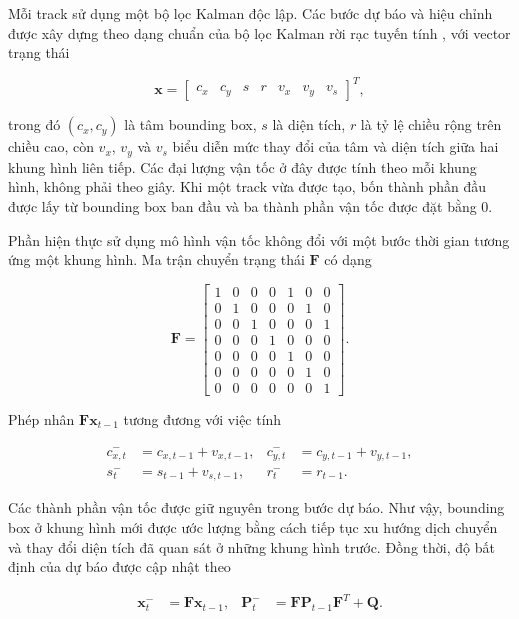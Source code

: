 Mỗi track sử dụng một bộ lọc Kalman độc lập. Các bước dự báo và hiệu chỉnh được xây dựng theo dạng chuẩn của bộ lọc Kalman rời rạc tuyến tính , với vector trạng thái

\begin{equation}
\mathbf{x}=\begin{bmatrix}c_x&c_y&s&r&v_x&v_y&v_s\end{bmatrix}^{T},
\label{eq:kalman_tracking_state}
\end{equation}

trong đó $(c_x,c_y)$ là tâm bounding box, $s$ là diện tích, $r$ là tỷ lệ chiều rộng trên chiều cao, còn $v_x$, $v_y$ và $v_s$ biểu diễn mức thay đổi của tâm và diện tích giữa hai khung hình liên tiếp. Các đại lượng vận tốc ở đây được tính theo mỗi khung hình, không phải theo giây. Khi một track vừa được tạo, bốn thành phần đầu được lấy từ bounding box ban đầu và ba thành phần vận tốc được đặt bằng 0.

Phần hiện thực sử dụng mô hình vận tốc không đổi với một bước thời gian tương ứng một khung hình. Ma trận chuyển trạng thái $\mathbf{F}$ có dạng

\[
\mathbf{F}=
\begin{bmatrix}
1&0&0&0&1&0&0\\
0&1&0&0&0&1&0\\
0&0&1&0&0&0&1\\
0&0&0&1&0&0&0\\
0&0&0&0&1&0&0\\
0&0&0&0&0&1&0\\
0&0&0&0&0&0&1
\end{bmatrix}.
\]

Phép nhân $\mathbf{F}\mathbf{x}_{t-1}$ tương đương với việc tính

\[
\begin{aligned}
c_{x,t}^{-}&=c_{x,t-1}+v_{x,t-1},&
c_{y,t}^{-}&=c_{y,t-1}+v_{y,t-1},\\
s_t^{-}&=s_{t-1}+v_{s,t-1},&
r_t^{-}&=r_{t-1}.
\end{aligned}
\]

Các thành phần vận tốc được giữ nguyên trong bước dự báo. Như vậy, bounding box ở khung hình mới được ước lượng bằng cách tiếp tục xu hướng dịch chuyển và thay đổi diện tích đã quan sát ở những khung hình trước. Đồng thời, độ bất định của dự báo được cập nhật theo

\begin{align}
\mathbf{x}_{t}^{-}&=\mathbf{F}\mathbf{x}_{t-1},
&\mathbf{P}_{t}^{-}&=\mathbf{F}\mathbf{P}_{t-1}\mathbf{F}^{T}+\mathbf{Q}.
\label{eq:kalman_tracking_predict}
\end{align}

